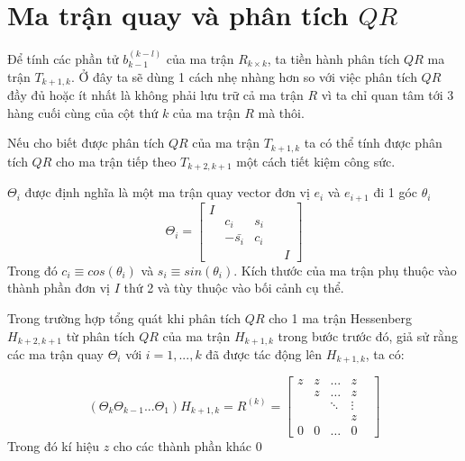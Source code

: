\section{Ma trận quay và phân tích $QR$}
Để tính các phần tử $b_{k-1}^{(k-l)}$ của ma trận $R_{k \times k}$, ta tiền hành 
phân tích $QR$ ma trận $T_{k+1, k}$. Ở đây ta sẽ dùng 1 cách nhẹ nhàng hơn so với việc phân tích $QR$ đầy đủ hoặc
ít nhất là không phải lưu trữ cả ma trận $R$ vì ta chỉ quan tâm tới 3 hàng cuối cùng của cột thứ $k$ của ma trận $R$ 
mà thôi.

Nếu cho biết được phân tích $QR$ của ma trận $T_{k+1,k}$ ta có thể tính được phân tích $QR$ cho ma trận tiếp theo $T_{k+2,k+1}$
một cách tiết kiệm công sức.

$\Theta_i$ được định nghĩa là một ma trận quay vector đơn vị $e_i$ và $e_{i+1}$ đi 1 góc $\theta_i$
\begin{equation}
    \Theta_i = \begin{bmatrix}
        I & & & \\
        & c_i & s_i & \\
        & -\bar{s_i} & c_i & \\
        & & & & I
    \end{bmatrix}
\end{equation}
Trong đó $c_i \equiv cos(\theta_i)$ và $s_i \equiv sin(\theta_i)$. Kích thước của ma trận phụ thuộc 
vào thành phần đơn vị $I$ thứ 2 và tùy thuộc vào bối cảnh cụ thể.

Trong trường hợp tổng quát khi phân tích $QR$ cho 1 ma trận Hessenberg $H_{k+2,k+1}$
từ phân tích $QR$ của ma trận $H_{k+1,k}$ trong bước trước đó, giả sử rằng các ma trận 
quay $\Theta_i$ với $i=1,...,k$ đã được tác động lên $H_{k+1,k}$, ta có:

\begin{equation}
    \left(\Theta_k \Theta_{k-1} ... \Theta_1\right)H_{k+1,k} = R^{(k)} =
    \begin{bmatrix}
        z & z & \ldots & z\\
        & z & \ldots & z \\
        & & \ddots & \vdots \\
        & & & z & \\
        0 & 0 & \ldots & 0
    \end{bmatrix}
\end{equation}
Trong đó kí hiệu $z$ cho các thành phần khác $0$

